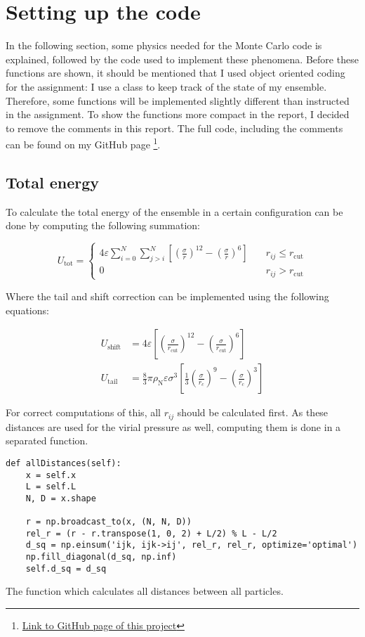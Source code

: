\section{Setting up the code}
In the following section, some physics needed for the Monte Carlo code is explained, followed by the code used to implement these phenomena. Before these functions are shown, it should be mentioned that I used object oriented coding for the assignment: I use a class to keep track of the state of my ensemble. Therefore, some functions will be implemented slightly different than instructed in the assignment. To show the functions more compact in the report, I decided to remove the comments in this report. The full code, including the comments can be found on my GitHub page \footnote{\href{https://github.com/JelleLagerweij/Canonecal-Monte-Carlo-for-Lennard-Jones-fluids}{Link to GitHub page of this project}}.
\subsection{Total energy}
To calculate the total energy of the ensemble in a certain configuration can be done by computing the following summation:

\begin{equation}
	U_\text{tot} = \begin{cases}
		4\varepsilon\sum_{i=0}^{N}\sum_{j>i}^{N}\left[\left(\frac{\sigma}{r}\right)^{12}-\left(\frac{\sigma}{r}\right)^6\right] &\quad r_{ij}\leq r_\text{cut}\\
		0&\quad r_{ij}>r_\text{cut}
	\end{cases} 
\end{equation}

Where the tail and shift correction can be implemented using the following equations:

\begin{align}
	U_\text{shift}&=4\varepsilon\left[\left(\frac{\sigma}{r_\text{cut}}\right)^{12}-\left(\frac{\sigma}{r_\text{cut}}\right)^6\right]\\
	U_\text{tail}&=\frac{8}{3}\pi\rho_\text{N}\varepsilon\sigma^3\left[\frac{1}{3}\left(\frac{\sigma}{r_c}\right)^9-\left(\frac{\sigma}{r_c}\right)^3\right]
\end{align}

For correct computations of this, all $r_{ij}$ should be calculated first. As these distances are used for the virial pressure as well, computing them is done in a separated function.

\begin{listing}[ht!]
	\begin{verbatim}
def allDistances(self):
	x = self.x
	L = self.L
	N, D = x.shape
	
	r = np.broadcast_to(x, (N, N, D))
	rel_r = (r - r.transpose(1, 0, 2) + L/2) % L - L/2
	d_sq = np.einsum('ijk, ijk->ij', rel_r, rel_r, optimize='optimal')
	np.fill_diagonal(d_sq, np.inf)
	self.d_sq = d_sq 
	\end{verbatim}
\caption{The function which calculates all distances between all particles.}
\label{Distances function}
\end{listing}

